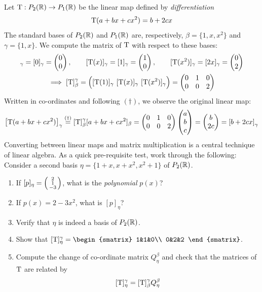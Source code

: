 \begin{example*}{}{}
	Let $\mathrm{T}:P_2(\mathbb{R})\to P_1(\mathbb{R})$ be the linear map defined by \emph{differentiation}
	\[
		\mathrm{T}(a+bx+cx^2)=b+2cx
	\]
	The standard bases of $P_2(\mathbb{R})$ and $P_1(\mathbb{R})$ are, respectively, $\beta=\{1,x,x^2\}$ and $\gamma=\{1,x\}$. We compute the matrix of $\mathrm{T}$ with respect to these bases:
	\begin{gather*}
		[\rT(1)]_\gamma=[0]_\gamma=\twovec 00,\qquad 
		[\rT(x)]_\gamma=[1]_\gamma=\twovec 10,\qquad 
		[\rT(x^2)]_\gamma=[2x]_\gamma=\twovec 02\\
		\implies [\rT]_\beta^\gamma
		=\Big([\rT(1)]_\gamma\ [\rT(x)]_\gamma\ [\rT(x^2)]_\gamma\Big)
		=\begin{pmatrix}
			0&1&0\\
			0&0&2
		\end{pmatrix}
	\end{gather*}
	Written in co-ordinates and following $(\dag)$, we observe the original linear map:
	\[
		\left[\mathrm{T}(a+bx+cx^2)\right]_\gamma 
		\overset{(\dag)}{=} [\mathrm{T}]_\beta^\gamma [a+bx+cx^2]_\beta 
		=\begin{pmatrix}
			0&1&0\\
			0&0&2
		\end{pmatrix} 
		\begin{pmatrix}a\\b\\c\end{pmatrix} 
		=\begin{pmatrix}b\\2c\end{pmatrix} 
		=\left[b+2cx\right]_\gamma
	\]
	Converting between linear maps and matrix multiplication is a central technique of linear algebra. As a quick pre-requisite test, work through the following:\medbreak
	Consider a second basis $\eta=\big\{1+x,x+x^2,x^2+1\big\}$ of $P_2(\mathbb{R})$.
	\begin{enumerate}
	  \item If $[p]_\eta=\left(\begin{smallmatrix}2\\1\\-3\end{smallmatrix}\right)$, what is the \emph{polynomial} $p(x)$?
	  \item If $p(x)=2-3x^2$, what is $[p]_\eta$?
	  \item Verify that $\eta$ is indeed a basis of $P_2(\mathbb{R})$.
		\item Show that $[\rT]_\eta^\gamma =\begin{smatrix}
			1&1&0\\
			0&2&2
		\end{smatrix}$.
		\item Compute the change of co-ordinate matrix $Q_\eta^\beta$ and check that the matrices of $\mathrm{T}$ are related by
		\[
			[\mathrm{T}]_\eta^\gamma = [\mathrm{T}]_\beta^\gamma Q_\eta^\beta
		\]
	\end{enumerate}
\end{example*}


\clearpage


